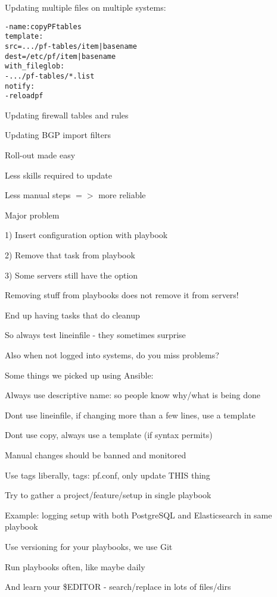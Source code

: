 \documentclass[17pt,Screen16to9,footrule]{foils}
\begin{document}
Updating multiple files on multiple systems:
\begin{alltt}\footnotesize
  - name: copy PF tables
    template:
      src=.../pf-tables/{{ item | basename }}
      dest=/etc/pf/{{ item | basename }}
    with_fileglob:
        - .../pf-tables/*.list
    notify:
      - reload pf
\end{alltt}

\begin{list1}
\item Updating firewall tables and rules
\item Updating BGP import filters
\item Roll-out made easy
\item Less skills required to update
\item Less manual steps $=>$ more reliable
\end{list1}


\begin{list1}
\item Major problem
\item 1) Insert configuration option with playbook
\item 2) Remove that task from playbook
\item 3) Some servers still have the option
\vskip 5mm
\item Removing stuff from playbooks does not remove it from servers!
\item End up having tasks that do cleanup
\item So always test lineinfile - they sometimes surprise
\item Also when not logged into systems, do you miss problems?
\end{list1}




Some things we picked up using Ansible:
\begin{list2}
\item Always use descriptive name: so people know why/what is being done
\item Dont use lineinfile, if changing more than a few lines, use a template
\item Dont use copy, always use a template (if syntax permits)
\item Manual changes should be banned and monitored
\item Use tags liberally, tags: pf.conf, only update THIS thing
\item Try to gather a project/feature/setup in single playbook
\item Example: logging setup with both PostgreSQL and Elasticsearch in same playbook
\item Use versioning for your playbooks, we use Git
\item Run playbooks often, like maybe daily
\end{list2}

\vskip 1cm

\centerline{\hlkbig And learn your \$EDITOR - search/replace in lots of files/dirs \smiley }

\myquestionspage
\end{document}
